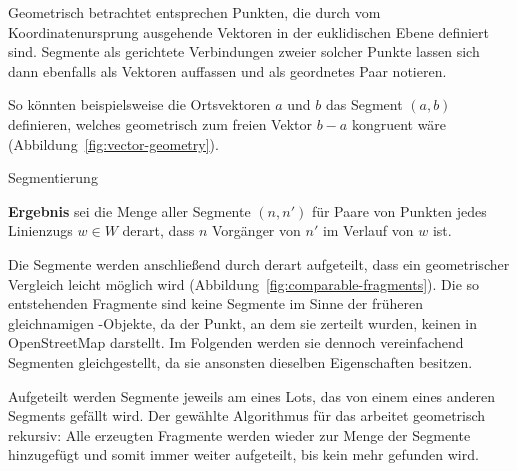 \documentclass[../main/thesis.tex]{subfiles}
\begin{document}
Geometrisch betrachtet entsprechen  Punkten, die durch vom Koordinatenursprung ausgehende Vektoren in der euklidischen Ebene definiert sind.
Segmente als gerichtete Verbindungen zweier solcher Punkte lassen sich dann ebenfalls als Vektoren auffassen und als geordnetes Paar notieren.

So könnten beispielsweise die Ortsvektoren $a$ und $b$ das Segment $(a,b)$ definieren, welches geometrisch zum freien Vektor $b - a$ kongruent wäre (Abbildung~\ref{fig:vector-geometry}).

\begin{algorithmhere}{Segmentierung}
\label{alg:Segmentierung}
\begin{algorithmic}
	\State \textbf{Ergebnis} sei die Menge aller Segmente $(n, n')$ für Paare von Punkten jedes Linienzugs $w \in W$ derart, dass $n$ Vorgänger von $n'$ im Verlauf von $w$ ist.
\EndFunction
\end{algorithmic}
\end{algorithmhere}


Die Segmente werden anschließend durch  derart aufgeteilt, dass ein geometrischer Vergleich leicht möglich wird (Abbildung~\ref{fig:comparable-fragments}).
Die so entstehenden Fragmente sind keine Segmente im Sinne der früheren gleichnamigen \osm-Objekte, da der Punkt, an dem sie zerteilt wurden, keinen  in OpenStreetMap darstellt.
Im Folgenden werden sie dennoch vereinfachend Segmenten gleichgestellt, da sie ansonsten dieselben Eigenschaften besitzen.

Aufgeteilt werden Segmente jeweils am  eines Lots, das von einem  eines anderen Segments gefällt wird.
Der gewählte Algorithmus für das  arbeitet geometrisch rekursiv:
Alle erzeugten Fragmente werden wieder zur Menge der Segmente hinzugefügt und somit immer weiter aufgeteilt, bis kein  mehr gefunden wird.

\end{document}

